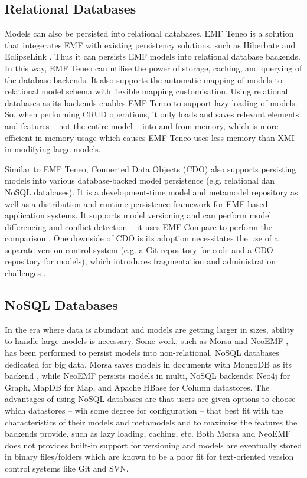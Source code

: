 \subsection{Relational Databases}
\label{sec:relational_databases}
Models can also be persisted into relational databases. EMF Teneo \cite{eclipse2017teneo} is a solution that integerates EMF with existing persistency solutions, such as Hiberbate \cite{hibernate2019hibernateorm} and EclipseLink \cite{eclipse2019eclipselink}. Thus it can persists EMF models into relational database backends. In this way, EMF Teneo can utilise the power of storage, caching, and querying of the database backends. It also supports the automatic mapping of models to relational model schema with flexible mapping customisation. Using relational databases as its backends enables EMF Teneo to support lazy loading of models. So, when performing CRUD operations, it only loads and saves relevant elements and features -- not the entire model -- into and from memory, which is more efficient in memory usage  which causes EMF Teneo uses less memory than XMI in modifying large models.

Similar to EMF Teneo, Connected Data Objects (CDO) \cite{eclipse2019cdo} also supports persisting models into various database-backed model persistence (e.g. relational dan NoSQL databases). It is a development-time model and metamodel repository as well as a distribution and runtime persistence framework for EMF-based application systems. It supports model versioning and can perform model differencing and conflict detection -- it uses EMF Compare \cite{emfcompare2018developer} to perform the comparison \cite{cdo2019emfcompare}. One downside of CDO is its adoption necessitates the use of a separate version control system (e.g. a Git repository for code and a CDO repository for models), which introduces fragmentation and administration challenges \cite{barmpis2014evaluation}.

\subsection{NoSQL Databases}
\label{sec:NoSQL Databases}
In the era where data is abundant and models are getting larger in sizes, ability to handle large models is necessary. Some work, such as Morsa \cite{DBLP:conf/models/Espinazo-PaganCM11} and NeoEMF \cite{daniel2016neoemf}, has been performed to persist models into non-relational, NoSQL databases dedicated for big data. Morsa saves models in documents with MongoDB as its backend \cite{mongodb}, while NeoEMF persists models in multi, NoSQL backends: Neo4j \cite{neo4j2019neo4j} for Graph, MapDB \cite{mapdb2019mapdb} for Map, and Apache HBase \cite{apache2019hbase} for Column datastores. The advantages of using NoSQL databases are that users are given options to choose which datastores -- wih some degree for configuration -- that best fit with the characteristics of their models and metamodels and to maximise the features  the backends provide, such as lazy loading, caching, etc. Both Morsa and NeoEMF does not provides built-in support for versioning and models are eventually stored in binary files/folders which are known to be a poor fit for text-oriented version control systems like Git and SVN. 

